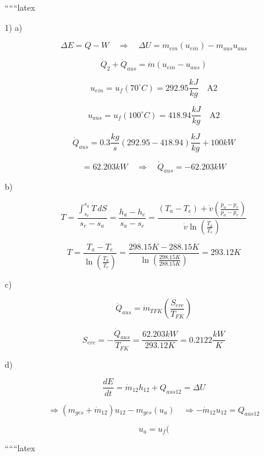 
``````latex

1) a)

\[
\Delta E = Q - W \quad \Rightarrow \quad \Delta U = m_{ein}(u_{ein}) - m_{aus} u_{aus}
\]

\[
\dot{Q}_2 + \dot{Q}_{aus} = \dot{m}(u_{ein} - u_{aus})
\]

\[
u_{ein} = u_f(70^\circ C) = 292.95 \frac{kJ}{kg} \quad \text{A2}
\]

\[
u_{aus} = u_f(100^\circ C) = 418.94 \frac{kJ}{kg} \quad \text{A2}
\]

\[
\dot{Q}_{aus} = 0.3 \frac{kg}{s} (292.95 - 418.94) \frac{kJ}{kg} + 100 kW
\]

\[
= 62.203 kW \quad \Rightarrow \quad \dot{Q}_{aus} = -62.203 kW
\]

b)

\[
T = \frac{\int_{s_e}^{s_a} T \, dS}{s_e - s_a} = \frac{h_a - h_e}{s_a - s_e} = \frac{(T_a - T_e) + \dot{v} \left( \frac{p_a - p_e}{p_a - p_e} \right)}{\dot{v} \ln \left( \frac{T_a}{T_e} \right)}
\]

\[
T = \frac{T_a - T_e}{\ln \left( \frac{T_a}{T_e} \right)} = \frac{298.15 K - 288.15 K}{\ln \left( \frac{298.15 K}{288.15 K} \right)} = 293.12 K
\]

c)

\[
\dot{Q}_{aus} = \dot{m}_{TFK} \left( \frac{S_{ere}}{T_{FK}} \right)
\]

\[
S_{ere} = - \frac{\dot{Q}_{aus}}{T_{FK}} = \frac{62.203 kW}{293.12 K} = 0.2122 \frac{kW}{K}
\]

d)

\[
\frac{dE}{dt} = \dot{m}_{12} h_{12} + Q_{aus12} = \Delta U
\]

\[
\Rightarrow (m_{ges} + \dot{m}_{12}) u_{12} - m_{ges}(u_a) \quad \Rightarrow - \dot{m}_{12} u_{12} = Q_{aus12}
\]

\[
u_a = u_f(
\]

``````latex


